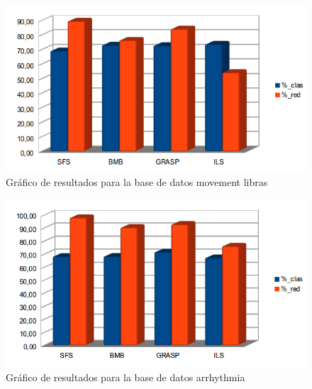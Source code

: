 \begin{figure} [H]
\centering
\includegraphics[width=1.0\linewidth]{graficaMovement}
\caption{Gráfico de resultados para la base de datos movement libras}
\label{fig:graficaMovement}
\end{figure}

\begin{figure} [H]
\centering
\includegraphics[width=1.0\linewidth]{Graficaarrhythmica}
\caption{Gráfico de resultados para la base de datos arrhythmia}
\label{fig:Graficaarrhythmica}
\end{figure}


